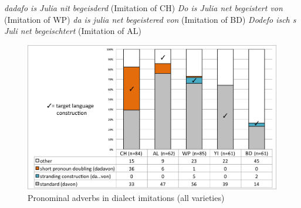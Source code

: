 \documentclass[output=paper]{LSP/langsci}
\begin{document}
\eal
\ex \textit{dadafo is Julia nit begeisderd} (Imitation of CH) \label{davon1}
\ex \textit{Do is Julia net begeistert von} (Imitation of WP) 
\ex \textit{da is julia net begeistered von} (Imitation of BD) 
\ex \textit{Dodefo isch s Juli net begeischtert} (Imitation of AL)
\zl

\begin{figure}[t]
\centering
\includegraphics[scale=0.42]{illustrations/schaf_etal_fig3}%
\caption{\label{diagramdadavon} Pronominal adverbs in dialect imitations (all varieties)}
\end{figure}
\end{document}
